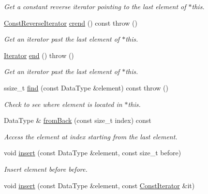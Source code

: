 \begin{DoxyCompactItemize}
\begin{DoxyCompactList}\small\item\em Get a constant reverse iterator pointing to the last element of {\ttfamily $\ast$this}. \end{DoxyCompactList}\item 
\hyperlink{classVectorDeque_a291aa5e53d483276367327acb93f3846}{Const\-Reverse\-Iterator} \hyperlink{classVectorDeque_abac13f397fa78185ae34fc14751ab720}{crend} () const   throw ()
\begin{DoxyCompactList}\small\item\em Get an iterator past the last element of {\ttfamily $\ast$this}. \end{DoxyCompactList}\item 
\hyperlink{classVectorDeque_a14c9e8124611465c5aec6687b9c18a4b}{Iterator} \hyperlink{classVectorDeque_a3fe1250d2f55a3208ac1a2c8597ca4ed}{end} ()  throw ()
\begin{DoxyCompactList}\small\item\em Get an iterator past the last element of {\ttfamily $\ast$this}. \end{DoxyCompactList}\item 
ssize\-\_\-t \hyperlink{classVectorDeque_a301ac89ba3198559c65bd7ff18f4b107}{find} (const Data\-Type \&element) const   throw ()
\begin{DoxyCompactList}\small\item\em Check to see where {\ttfamily element} is located in {\ttfamily $\ast$this}. \end{DoxyCompactList}\item 
Data\-Type \& \hyperlink{classVectorDeque_a1685429a5556997348d6cf155f499fcd}{from\-Back} (const size\-\_\-t index) const 
\begin{DoxyCompactList}\small\item\em Access the element at {\ttfamily index} starting from the last element. \end{DoxyCompactList}\item 
void \hyperlink{classVectorDeque_a8d49f96833f4d6664159a596c3c361be}{insert} (const Data\-Type \&element, const size\-\_\-t before)
\begin{DoxyCompactList}\small\item\em Insert {\ttfamily element} before {\ttfamily before}. \end{DoxyCompactList}\item 
void \hyperlink{classVectorDeque_af61c9b5aa7cec8e777974e6394ae3a9b}{insert} (const Data\-Type \&element, const \hyperlink{classVectorDeque_a5cfe4fc61668a1213c99e052450297e6}{Const\-Iterator} \&it)

\end{DoxyCompactItemize}
